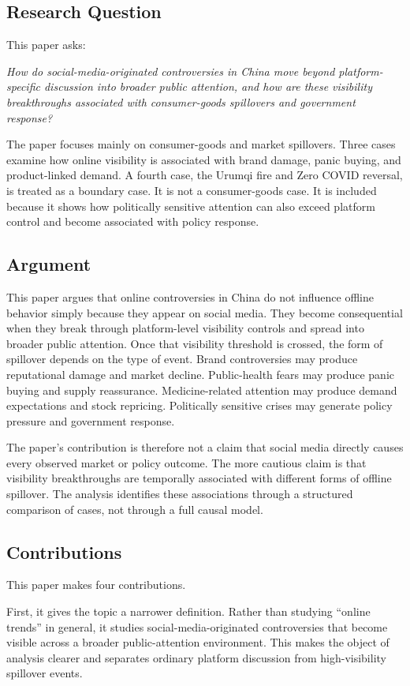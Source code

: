 \documentclass[conference]{IEEEtran}
\begin{document}
\subsection{Research Question}
This paper asks:

\emph{How do social-media-originated controversies in China move beyond platform-specific discussion into broader public attention, and how are these visibility breakthroughs associated with consumer-goods spillovers and government response?}

The paper focuses mainly on consumer-goods and market spillovers. Three cases examine how online visibility is associated with brand damage, panic buying, and product-linked demand. A fourth case, the Urumqi fire and Zero COVID reversal, is treated as a boundary case. It is not a consumer-goods case. It is included because it shows how politically sensitive attention can also exceed platform control and become associated with policy response.

\subsection{Argument}
This paper argues that online controversies in China do not influence offline behavior simply because they appear on social media. They become consequential when they break through platform-level visibility controls and spread into broader public attention. Once that visibility threshold is crossed, the form of spillover depends on the type of event. Brand controversies may produce reputational damage and market decline. Public-health fears may produce panic buying and supply reassurance. Medicine-related attention may produce demand expectations and stock repricing. Politically sensitive crises may generate policy pressure and government response.

The paper's contribution is therefore not a claim that social media directly causes every observed market or policy outcome. The more cautious claim is that visibility breakthroughs are temporally associated with different forms of offline spillover. The analysis identifies these associations through a structured comparison of cases, not through a full causal model.

\subsection{Contributions}
This paper makes four contributions.

First, it gives the topic a narrower definition. Rather than studying ``online trends'' in general, it studies social-media-originated controversies that become visible across a broader public-attention environment. This makes the object of analysis clearer and separates ordinary platform discussion from high-visibility spillover events.
\end{document}
